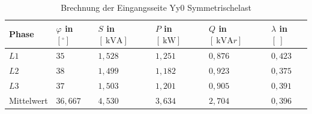 \begin{enumerate}[label=\alph*)]
	      \begin{table}[h!]
		      \caption{Brechnung der Eingangsseite Yy0 Symmetrischelast}
		      \centering
		      \begin{tabular}{llllll}
			      \\ \hline
			      Phase      & $\varphi$ in $[^\circ]$ & $S$ in $[\SI{}{\kilo\volt\ampere}]$ & $P$ in $[\SI{}{\kilo\watt}]$ & $Q$ in $[\SI{}{\kilo\volt\ampere r}]$ & $\lambda$ in $[\ ]$ \\ \hline
			      $L1$       & $35$                    & $1,528$                             & $1,251$                      & $0,876$                               & $0,423$             \\
			      $L2$       & $38$                    & $1,499$                             & $1,182$                      & $0,923$                               & $0,375$             \\
			      $L3$       & $37$                    & $1,503$                             & $1,201$                      & $0,905$                               & $0,391$             \\ \hline
			      Mittelwert & $36,667$                & $4,530$                             & $3,634$                      & $2,704$                               & $0,396$             \\ \hline\hline
		      \end{tabular}
	      \end{table}


\end{enumerate}
